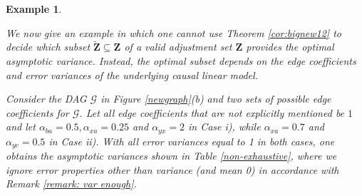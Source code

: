 \documentclass[11pt,a4paper]{article}
\newtheorem{Example}[Satz]{Example}
\theoremstyle{definition}
\theoremstyle{remark}
\newcommand{\g}[1][G]{\mathcal{#1}}
\newcommand{\optb}[2][X,Y]{\mathbf{O}(\mathbf{#1},#2)}
\begin{document}
%




\begin{Example}
	\label{hidden}
	
	
	
	We now give an example in which one cannot use Theorem \ref{cor:bignew12} to decide which subset $\mathbf{\tilde{Z}} \subseteq \mathbf{Z}$ of a valid adjustment set $\mathbf{Z}$ provides the optimal asymptotic variance. Instead, the optimal subset depends on the edge coefficients and error variances of the underlying causal linear model.
	
	Consider the DAG $\g$ in Figure \ref{newgraph}(b) and two sets of possible edge coefficients for $\g$. Let all edge coefficients that are not explicitly mentioned be $1$ and let $\alpha_{ba} = 0.5, \alpha_{xa} = 0.25$ and $\alpha_{yx} = 2$ in Case i), while $\alpha_{xa} = 0.7$ and $\alpha_{yc}=0.5$ in Case ii). With all error variances equal to 1 in both cases, one obtains the asymptotic variances shown in Table \ref{non-exhaustive}, where we ignore error properties other than variance (and mean 0) in accordance with Remark \ref{remark: var enough}.
	
	
	

\end{Example}
\end{document}
